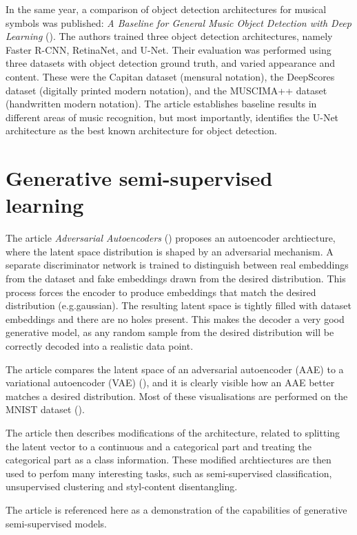 In the same year, a comparison of object detection architectures for musical symbols was published: \emph{A Baseline for General Music Object Detection with Deep Learning} (\cite{PachaBaseline}). The authors trained three object detection architectures, namely Faster R-CNN, RetinaNet, and U-Net. Their evaluation was performed using three datasets with object detection ground truth, and varied appearance and content. These were the Capitan dataset (mensural notation), the DeepScores dataset (digitally printed modern notation), and the MUSCIMA++ dataset (handwritten modern notation). The article establishes baseline results in different areas of music recognition, but most importantly, identifies the U-Net architecture as the best known architecture for object detection.


\section{Generative semi-supervised learning}

The article \emph{Adversarial Autoencoders} (\cite{AdversarialAutoencoders}) proposes an autoencoder archtiecture, where the latent space distribution is shaped by an adversarial mechanism. A separate discriminator network is trained to distinguish between real embeddings from the dataset and fake embeddings drawn from the desired distribution. This process forces the encoder to produce embeddings that match the desired distribution (e.g.\@ gaussian). The resulting latent space is tightly filled with dataset embeddings and there are no holes present. This makes the decoder a very good generative model, as any random sample from the desired distribution will be correctly decoded into a realistic data point.

The article compares the latent space of an adversarial autoencoder (AAE) to a variational autoencoder (VAE) (\cite{VariationalAutoencoder}), and it is clearly visible how an AAE better matches a desired distribution. Most of these visualisations are performed on the MNIST dataset (\cite{Mnist}).

The article then describes modifications of the architecture, related to splitting the latent vector to a continuous and a categorical part and treating the categorical part as a class information. These modified archtiectures are then used to perfom many interesting tasks, such as semi-supervised classification, unsupervised clustering and styl-content disentangling.

The article is referenced here as a demonstration of the capabilities of generative semi-supervised models.

